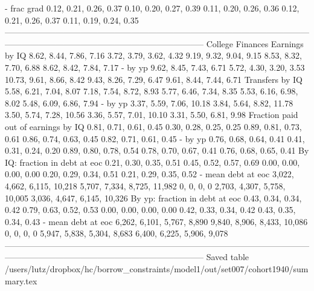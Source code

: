                            - frac grad       0.12, 0.21, 0.26, 0.37       0.10, 0.20, 0.27, 0.39   0.11, 0.20, 0.26, 0.36       0.12, 0.21, 0.26, 0.37       0.11, 0.19, 0.24, 0.35
-----------------------------------------------------------------------------------------------------------------------------------------------------------------------------------
                      College Finances                                                                                                                                             
                        Earnings by IQ       8.62, 8.44, 7.86, 7.16       3.72, 3.79, 3.62, 4.32   9.19, 9.32, 9.04, 9.15       8.53, 8.32, 7.70, 6.88       8.62, 8.42, 7.84, 7.17
                               - by yp       9.62, 8.45, 7.43, 6.71       5.72, 4.30, 3.20, 3.53  10.73, 9.61, 8.66, 8.42       9.43, 8.26, 7.29, 6.47       9.61, 8.44, 7.44, 6.71
                       Transfers by IQ       5.58, 6.21, 7.04, 8.07       7.18, 7.54, 8.72, 8.93   5.77, 6.46, 7.34, 8.35       5.53, 6.16, 6.98, 8.02       5.48, 6.09, 6.86, 7.94
                               - by yp      3.37, 5.59, 7.06, 10.18      3.84, 5.64, 8.82, 11.78  3.50, 5.74, 7.28, 10.56      3.36, 5.57, 7.01, 10.10       3.31, 5.50, 6.81, 9.98
   Fraction paid out of earnings by IQ       0.81, 0.71, 0.61, 0.45       0.30, 0.28, 0.25, 0.25   0.89, 0.81, 0.73, 0.61       0.86, 0.74, 0.63, 0.45       0.82, 0.71, 0.61, 0.45
                               - by yp       0.76, 0.68, 0.64, 0.41       0.41, 0.31, 0.24, 0.20   0.89, 0.80, 0.78, 0.54       0.78, 0.70, 0.67, 0.41       0.76, 0.68, 0.65, 0.41
        By IQ: fraction in debt at eoc       0.21, 0.30, 0.35, 0.51       0.45, 0.52, 0.57, 0.69   0.00, 0.00, 0.00, 0.00       0.20, 0.29, 0.34, 0.51       0.21, 0.29, 0.35, 0.52
                    - mean debt at eoc  3,022, 4,662, 6,115, 10,218  5,707, 7,334, 8,725, 11,982               0, 0, 0, 0  2,703, 4,307, 5,758, 10,005  3,036, 4,647, 6,145, 10,326
        By yp: fraction in debt at eoc       0.43, 0.34, 0.34, 0.42       0.79, 0.63, 0.52, 0.53   0.00, 0.00, 0.00, 0.00       0.42, 0.33, 0.34, 0.42       0.43, 0.35, 0.34, 0.43
                    - mean debt at eoc   6,262, 6,101, 5,767, 8,890  9,840, 8,906, 8,433, 10,086               0, 0, 0, 0   5,947, 5,838, 5,304, 8,683   6,400, 6,225, 5,906, 9,078
-----------------------------------------------------------------------------------------------------------------------------------------------------------------------------------
Saved table  /users/lutz/dropbox/hc/borrow_constraints/model1/out/set007/cohort1940/summary.tex 
